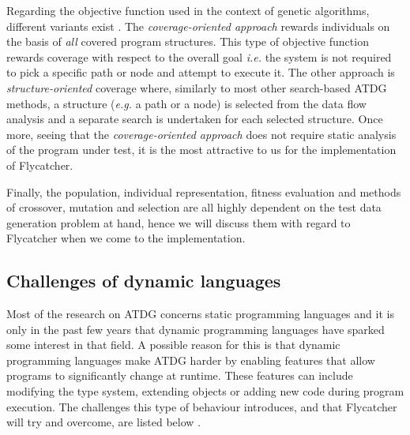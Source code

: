 \documentclass[a4paper,11pt,titlepage]{report}
\begin{document}
Regarding the objective function used in the context of genetic algorithms, different variants exist \cite{mcminn2004search}. The \emph{coverage-oriented approach} rewards individuals on the basis of \emph{all} covered program structures. This type of objective function rewards coverage with respect to the overall goal \emph{i.e.} the system is not required to pick a specific path or node and attempt to execute it. The other approach is \emph{structure-oriented} coverage where, similarly to most other search-based ATDG methods, a structure (\emph{e.g.} a path or a node) is selected from the data flow analysis and a separate search is undertaken for each selected structure. Once more, seeing that the \emph{coverage-oriented approach} does not require static analysis of the program under test, it is the most attractive to us for the implementation of \textsf{Flycatcher}.

Finally, the population, individual representation, fitness evaluation and methods of crossover, mutation and selection are all highly dependent on the test data generation problem at hand, hence we will discuss them with regard to \textsf{Flycatcher} when we come to the implementation.






\subsection{Challenges of dynamic languages}

Most of the research on ATDG concerns static programming languages \cite{mahmood2007systematic} and it is only in the past few years that dynamic programming languages have sparked some interest in that field. A possible reason for this is that dynamic programming languages make ATDG harder by enabling features that allow programs to significantly change at runtime. These features can include modifying the type system, extending objects or adding new code during program execution. The challenges this type of behaviour introduces, and that \textsf{Flycatcher} will try and overcome, are listed below \cite{ducasse2011challenges}.
\end{document}
